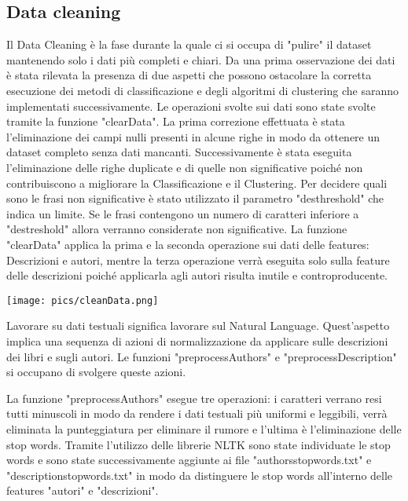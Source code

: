 \documentclass[12pt,oneside]{article}
\begin{document}
    \begin{enumerate}
    \subsection{Data cleaning}
    \begin{justify}
    Il Data Cleaning è la fase durante la quale ci si occupa di "pulire" il dataset mantenendo solo i dati più completi e chiari. Da una prima osservazione dei dati è stata rilevata la presenza di due aspetti che possono ostacolare la corretta esecuzione dei metodi di classificazione e degli algoritmi di clustering che saranno implementati successivamente. Le operazioni svolte sui dati sono state svolte tramite la funzione "clearData". La prima correzione effettuata è stata l'eliminazione dei campi nulli presenti in alcune righe in modo da ottenere un dataset completo senza dati mancanti. Successivamente è stata eseguita l'eliminazione delle righe duplicate e di quelle non significative poiché non contribuiscono a migliorare la Classificazione e il Clustering. Per decidere quali sono le frasi non significative è stato utilizzato il parametro "des\textunderscore{}threshold" che indica un limite. Se le frasi contengono un numero di caratteri inferiore a "des\textunderscore{}treshold" allora verranno considerate non significative. La funzione "clearData" applica la prima e la seconda operazione sui dati delle features: Descrizioni e autori, mentre la terza operazione verrà eseguita solo sulla feature delle descrizioni poiché applicarla agli autori risulta inutile e controproducente. 
    \end{justify}
    \texttt{[image: pics/cleanData.png]}
    \newpage
    \begin{justify}
    Lavorare su dati testuali significa lavorare sul Natural Language. Quest'aspetto implica una sequenza di azioni di normalizzazione da applicare sulle descrizioni dei libri e sugli autori. Le funzioni "preprocessAuthors" e "preprocessDescription" si occupano di svolgere queste azioni.
    \end{justify}
    \begin{justify}
    La funzione "preprocessAuthors" esegue tre operazioni: i caratteri verrano resi tutti minuscoli in modo da rendere i dati testuali più uniformi e leggibili, verrà eliminata la punteggiatura per eliminare il rumore e l'ultima è l'eliminazione delle stop words. Tramite l'utilizzo delle librerie NLTK sono state individuate le stop words e sono state successivamente aggiunte ai file "authors\textunderscore{}stopwords.txt" e "description\textunderscore{}stopwords.txt" in modo da distinguere le stop words all'interno delle features "autori" e "descrizioni". 

\end{justify}
\end{enumerate}
\end{document}
